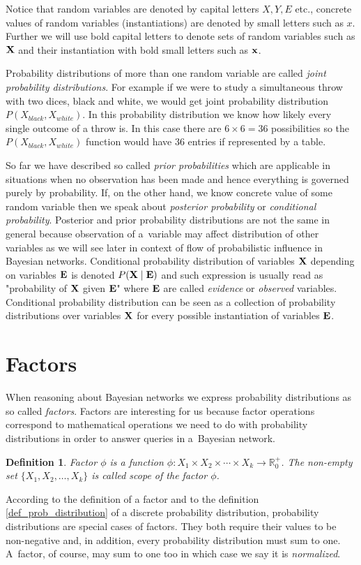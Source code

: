\documentclass[english,cover]{fitthesis} %
\newtheorem{math_def}{Definition}[chapter] %
\newcommand{\term}[1]{\emph{#1}}           %
\newcommand{\vars}[1]{{\bold{#1}}}         %
\begin{document}
Notice that random variables are denoted by capital letters $X, Y, E$ etc., concrete values of random variables (instantiations) are denoted by small letters such as $x$. Further we will use bold capital letters to denote sets of random variables such as $\vars{X}$ and their instantiation with bold small letters such as $\vars{x}$.

Probability distributions of more than one random variable are called \term{joint probability distributions}. For example if we were to study a simultaneous throw with two dices, black and white, we would get joint probability distribution $P(X_{black},X_{white})$. In this probability distribution we know how likely every single outcome of a throw is. In this case there are $6 \times 6 = 36$ possibilities so the $P(X_{black},X_{white})$ function would have 36 entries if represented by a table.

So far we have described so called \term{prior probabilities} which are applicable in situations when no observation has been made and hence everything is governed purely by probability. If, on the other hand, we know concrete value of some random variable then we speak about \term{posterior probability} or \term{conditional probability}.
Posterior and prior probability distributions are not the same in general because observation of a~variable may affect distribution of other variables as we will see later in context of flow of probabilistic influence in Bayesian networks.
Conditional probability distribution of variables $\vars{X}$ depending on variables $\vars{E}$ is denoted $P(\vars{X}\mid\vars{E})$ and such expression is usually read as "probability of $\vars{X}$ given $\vars{E}$" where $\vars{E}$ are called \term{evidence} or \term{observed} variables. Conditional probability distribution can be seen as a collection of probability distributions over variables $\vars{X}$ for every possible instantiation of variables $\vars{E}$.


\section{Factors}
When reasoning about Bayesian networks we express probability distributions as so called \term{factors}. Factors are interesting for us because factor operations correspond to mathematical operations we need to do with probability distributions in order to answer queries in a~Bayesian network. 
\begin{math_def}\label{def_factor}
    Factor $\phi$ is a function $\phi: X_1 \times X_2 \times \dotsm \times X_k \rightarrow \mathbb{R}_0^+$. The non-empty set $\lbrace X_1, X_2, \dots, X_k \rbrace$ is called scope of the factor $\phi$.
\end{math_def}
According to the definition of a factor and to the definition \ref{def_prob_distribution} of a discrete probability distribution, probability distributions are special cases of factors. They both require their values to be non-negative and, in addition, every probability distribution must sum to one. A~factor, of course, may sum to one too in which case we say it is \term{normalized}.
\end{document}
